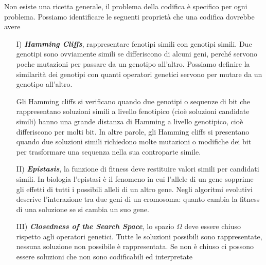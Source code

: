 Non esiste una ricetta generale, il problema della codifica è specifico per ogni problema. Possiamo identificare le seguenti proprietà che una codifica dovrebbe avere
\begin{itemize}
    \item[I)] \textit{\textbf{Hamming Cliffs}}, rappresentare fenotipi simili con genotipi simili. Due genotipi sono ovviamente simili se differiscono di alcuni geni, perché servono poche mutazioni per passare da un genotipo all’altro. Possiamo definire la similarità dei genotipi con quanti operatori genetici servono per mutare da un genotipo all’altro.

    Gli Hamming cliffs si verificano quando due genotipi o sequenze di bit che rappresentano soluzioni simili a livello fenotipico (cioè soluzioni candidate simili) hanno una grande distanza di Hamming a livello genotipico, cioè differiscono per molti bit. In altre parole, gli Hamming cliffs si presentano quando due soluzioni simili richiedono molte mutazioni o modifiche dei bit per trasformare una sequenza nella sua controparte simile. 
    \item[II)] \textit{\textbf{Epistasis}}, la funzione di fitness deve restituire valori simili per candidati simili. In biologia l’epistasi è il fenomeno in cui l’allele di un gene sopprime gli effetti di tutti i possibili alleli di un altro gene. Negli algoritmi evolutivi descrive l’interazione tra due geni di un cromosoma: quanto cambia la fitness di una soluzione se si cambia un suo gene.
    \item[III)] \textit{\textbf{Closedness of the Search Space}}, lo spazio $\Omega$ deve essere chiuso rispetto agli operatori genetici. Tutte le soluzioni possibili sono rappresentate, nessuna soluzione non possibile è rappresentata. Se non è chiuso ci possono essere soluzioni che non sono codificabili ed interpretate 
\end{itemize}

